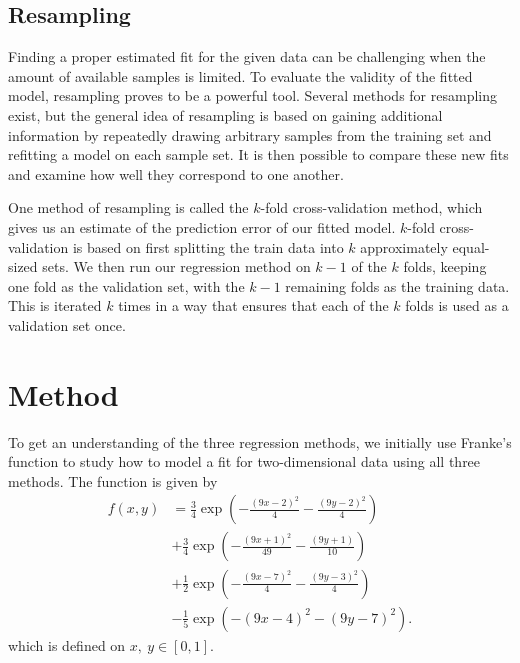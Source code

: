 \documentclass[a4paper, 10pt]{article}
\begin{document}
\begin{multicols}{2}
\subsection{Resampling}
Finding a proper estimated fit for the given data can be challenging when the amount of available samples is limited. To evaluate the validity of the fitted model, resampling proves to be a powerful tool. Several methods for resampling exist, but the general idea of resampling is based on gaining additional information by repeatedly drawing arbitrary samples from the training set and refitting a model on each sample set. It is then possible to compare these new fits and examine how well they correspond to one another.

One method of resampling is called the $k$-fold cross-validation method, which gives us an estimate of the prediction error of our fitted model. $k$-fold cross-validation is based on first splitting the train data into $k$ approximately equal-sized sets.  We then run our regression method on $k-1$ of the $k$ folds, keeping one fold as the validation set, with the $k-1$ remaining folds as the training data. This is iterated $k$ times in a way that ensures that each of the $k$ folds is used as a validation set once. 



\section{Method}
To get an understanding of the three regression methods, we initially use Franke's function to study how to model a fit for two-dimensional data using all three methods. The function is given by 
\begin{align}
f(x,y) &= \frac{3}{4}\exp{\left(-\frac{(9x-2)^2}{4}   - \frac{(9y-2)^2}{4}\right)} \nonumber\\
 &+\frac{3}{4}\exp{\left(-\frac{(9x+1)^2}{49}- \frac{(9y+1)}{10}\right)} \nonumber\\
 &+\frac{1}{2}\exp{\left(-\frac{(9x-7)^2}{4} - \frac{(9y-3)^2}{4}\right)} \nonumber\\
 &-\frac{1}{5}\exp{\left(-(9x-4)^2 - (9y-7)^2\right) }.
\end{align} which is defined on $x,\ y \in [0,1]$. 










\end{multicols}
\end{document}
